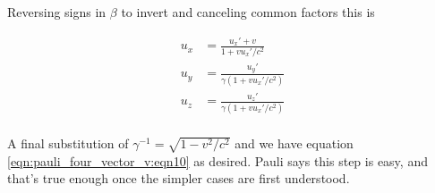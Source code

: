 Reversing signs in $\beta$ to invert and canceling common factors this is

\begin{align*}
u_x &=
\frac{u_x' + v }
{ 1 + v u_x'/c^2 } \\
u_y &=
\frac{u_y' }
{\gamma ( 1 + v u_x'/c^2 )} \\
u_z &=
\frac{u_z' }
{\gamma ( 1 + v u_x'/c^2 )} \\
\end{align*}

A final substitution of $\gamma^{-1} = \sqrt{1 - v^2/c^2}$ and we have
equation \ref{eqn:pauli_four_vector_v:eqn10} as desired.  Pauli says this step is easy, and that's
true enough once the simpler cases are first understood.

%
%

%
